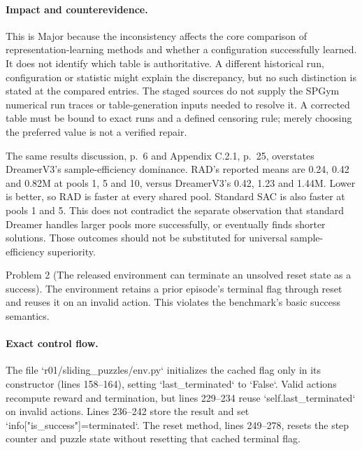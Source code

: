 \documentclass[10pt]{article}
\begin{document}
\paragraph*{Impact and counterevidence.}\mbox{}\par
This is Major because the inconsistency affects the core comparison of representation-learning methods and whether a configuration successfully learned. It does not identify which table is authoritative. A different historical run, configuration or statistic might explain the discrepancy, but no such distinction is stated at the compared entries. The staged sources do not supply the SPGym numerical run traces or table-generation inputs needed to resolve it. A corrected table must be bound to exact runs and a defined censoring rule; merely choosing the preferred value is not a verified repair.\par
The same results discussion, p. 6 and Appendix C.2.1, p. 25, overstates DreamerV3’s sample-efficiency dominance. RAD’s reported means are 0.24, 0.42 and 0.82M at pools 1, 5 and 10, versus DreamerV3’s 0.42, 1.23 and 1.44M. Lower is better, so RAD is faster at every shared pool. Standard SAC is also faster at pools 1 and 5. This does not contradict the separate observation that standard Dreamer handles larger pools more successfully, or eventually finds shorter solutions. Those outcomes should not be substituted for universal sample-efficiency superiority.\par
Problem 2 (The released environment can terminate an unsolved reset state as a success).  The environment retains a prior episode’s terminal flag through reset and reuses it on an invalid action. This violates the benchmark’s basic success semantics.\par
\paragraph*{Exact control flow.}\mbox{}\par
The file `r01/sliding\_puzzles/env.py` initializes the cached flag only in its constructor (lines 158–164), setting `last\_terminated` to `False`. Valid actions recompute reward and termination, but lines 229–234 reuse `self.last\_terminated` on invalid actions. Lines 236–242 store the result and set `info["is\_success"]=terminated`. The reset method, lines 249–278, resets the step counter and puzzle state without resetting that cached terminal flag.\par
\end{document}
